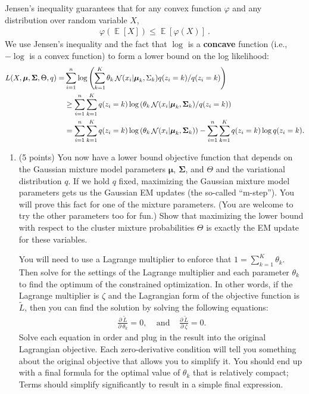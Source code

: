 \documentclass[10pt]{article}
\newcommand{\bmu}{{\boldsymbol \mu}}
\newcommand{\bSigma}{{\boldsymbol \Sigma}}
\DeclareMathOperator*{\E}{{\mathbb E}}
\DeclareMathOperator*{\normal}{{\cal N}}
\begin{document}
\begin{enumerate}
Jensen's inequality guarantees that for any convex function $\varphi$ and any distribution over random variable $X$,
\begin{align}
\varphi\left( \E \left[ X \right] \right) \le \E \left[  \varphi(X) \right]~.
\label{eq:jensen}
\end{align}
We use Jensen's inequality and the fact that $\log$ is a \textbf{concave} function (i.e., $-\log$ is a convex function)  to form a lower bound on the log likelihood:
\begin{align}
L(X, \bmu, \bSigma, \Theta, q) =& \sum_{i=1}^n \log \left(\sum_{k = 1}^K \theta_k \normal(x_i | \bmu_k, \Sigma_k) q(z_i = k) / q(z_i = k) \right)\\
& \ge \sum_{i=1}^n \sum_{k = 1}^K q(z_i = k) \log\left(\theta_k \normal(x_i | \bmu_k, \bSigma_k) / q(z_i = k) \right)\\
& = \sum_{i=1}^n \sum_{k = 1}^K q(z_i = k) \log\left(\theta_k \normal(x_i | \bmu_k, \bSigma_k)\right) - \sum_{i=1}^n \sum_{k=1}^K q(z_i = k) \log q(z_i = k) .
\end{align}

\begin{enumerate}


\item (5 points) You now have a lower bound objective function that depends on the Gaussian mixture model parameters $\bmu$, $\bSigma$, and $\Theta$ and the variational distribution $q$. If we hold $q$ fixed, maximizing the Gaussian mixture model parameters gets us the Gaussian EM updates (the so-called ``m-step''). You will prove this fact for one of the mixture parameters. (You are welcome to try the other parameters too for fun.) Show that maximizing the lower bound with respect to the cluster mixture probabilities $\Theta$ is exactly the EM update for these variables. 

You will need to use a Lagrange multiplier to enforce that $1 = \sum_{k=1}^K \theta_k$. Then solve for the settings of the Lagrange multiplier and each parameter $\theta_k$ to find the optimum of the constrained optimization. In other words, if the Lagrange multiplier is $\zeta$ and the Lagrangian form of the objective function is $\tilde{L}$, then you can find the solution by solving the following equations:
\begin{equation}
\begin{aligned}
\frac{\partial ~ \tilde{L}}{\partial ~ \theta_k} = 0, ~~~~~\textrm{and}~~~~~ \frac{\partial ~ \tilde{L}}{\partial ~ \zeta} = 0.
\end{aligned}
\end{equation}
Solve each equation in order and plug in the result into the original Lagrangian objective. Each zero-derivative condition will tell you something about the original objective that allows you to simplify it. 
You should end up with a final formula for the optimal value of $\theta_k$ that is relatively compact; Terms should simplify significantly to result in a simple final expression.



\end{enumerate}
\end{enumerate}
\end{document}
